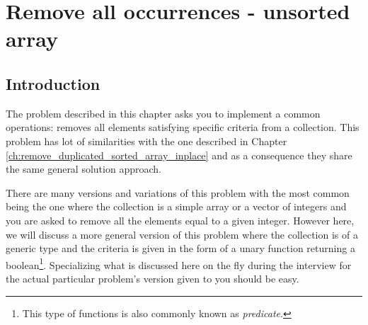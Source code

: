 %



\chapter{Remove all occurrences -  unsorted array}
\label{ch:remove_all_occurrences_unsorted_array_inplace}
\section*{Introduction}
The problem described in this chapter asks you to implement a common operations: removes all
elements satisfying specific criteria from a collection. This problem has lot of similarities with
the one described in Chapter \ref{ch:remove_duplicated_sorted_array_inplace} and as a consequence
they share the same general solution approach. 

There are many versions and variations of this problem with the most common being the one where the
collection is a simple array or a vector of integers and you are asked to remove all the elements
equal to a given integer. However here, we will discuss a more general version of this problem where
the collection is of a generic type  and the criteria is given in the form of a unary
function returning a boolean\footnote{This type of functions is also commonly known as
\textit{predicate}.}. Specializing what is discussed here on the fly during the interview for the
actual particular problem's version given to you should be easy.


